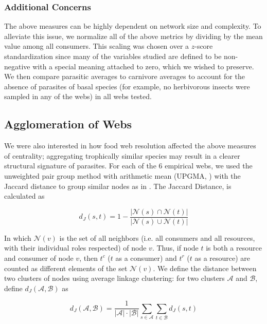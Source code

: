\documentclass[/home/nkappler/Research/Dissertation/dissertation.tex]{subfiles}
\begin{document}
\begin{bibunit}
\subsubsection{Additional Concerns} The above measures can be highly dependent
on network size and complexity. To alleviate this issue, we normalize all of
the above metrics by dividing by the mean value among all consumers. This
scaling was chosen over a $z$-score standardization since many of the variables
studied are defined to be non-negative with a special meaning attached to zero,
which we wished to preserve. We then compare parasitic averages to carnivore
averages to account for the absence of parasites of basal species (for example,
no herbivorous insects were sampled in any of the webs) in all webs tested.

\subsection{Agglomeration of Webs} We were also interested in how food web
resolution affected the above measures of centrality; aggregating trophically
similar species may result in a clearer structural signature of parasites. For
each of the 6 empirical webs, we used the unweighted pair group method with
arithmetic mean (UPGMA, \cite*{Sokal1958}) with the Jaccard distance to group
similar nodes as in \cite*{Martinez1991}. The Jaccard Distance,
\cite*{Jaccard1908} is calculated as 

\begin{equation} 
    d_J(s,t) = 1-\frac{|\mathcal{N}(s)\cap \mathcal{N}(t)|}{|\mathcal{N}(s)\cup \mathcal{N}(t)|}
\label{eq:JaccardDistance} 
\end{equation} 

In which $\mathcal{N}(v)$ is the set of all neighbors (i.e. all consumers and all
resources, with their individual roles respected) of node $v$. Thus, if node
$t$ is both a resource and consumer of node $v$, then $t^c$ ($t$ as a consumer)
and $t^r$ ($t$ as a resource) are counted as different elements of the set
$\mathcal{N}(v)$. We define the distance between two clusters of nodes using
average linkage clustering: for two clusters $\mathcal{A}$ and $\mathcal{B}$,
define $d_J(\mathcal{A},\mathcal{B})$ as

\begin{equation} 
    d_J(\mathcal{A},\mathcal{B}) = \frac{1}{|\mathcal{A}|\cdot|\mathcal{B}|}\sum_{s\in\mathcal{A}}\sum_{t\in\mathcal{B}}d_J(s,t)
\label{eq:averageLinkage} 
\end{equation}


\end{bibunit}
\end{document}
